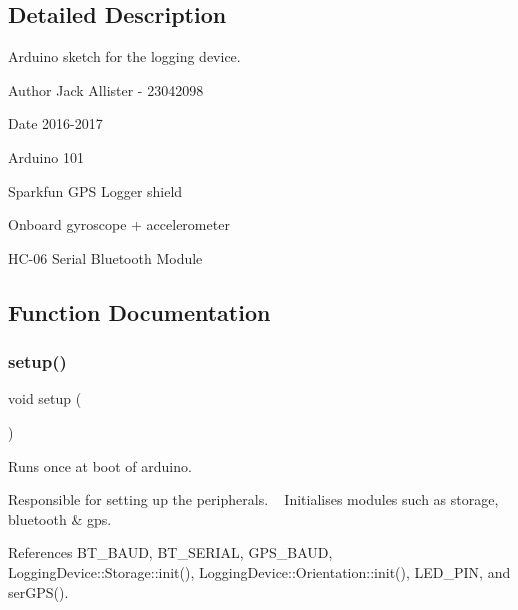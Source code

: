 \subsection{Detailed Description}
Arduino sketch for the logging device. 

\begin{DoxyAuthor}{Author}
Jack Allister -\/ 23042098 
\end{DoxyAuthor}
\begin{DoxyDate}{Date}
2016-\/2017
\begin{DoxyItemize}
\item Arduino 101
\item Sparkfun G\+PS Logger shield
\item Onboard gyroscope + accelerometer
\item H\+C-\/06 Serial Bluetooth Module 
\end{DoxyItemize}
\end{DoxyDate}


\subsection{Function Documentation}
\mbox{\label{logging-device_8ino_a4fc01d736fe50cf5b977f755b675f11d}} 
\subsubsection{\texorpdfstring{setup()}{setup()}}
{\footnotesize\ttfamily void setup (\begin{DoxyParamCaption}{ }\end{DoxyParamCaption})}



Runs once at boot of arduino. 

Responsible for setting up the peripherals. ~\newline
Initialises modules such as storage, bluetooth \& gps. 

References B\+T\+\_\+\+B\+A\+UD, B\+T\+\_\+\+S\+E\+R\+I\+AL, G\+P\+S\+\_\+\+B\+A\+UD, Logging\+Device\+::\+Storage\+::init(), Logging\+Device\+::\+Orientation\+::init(), L\+E\+D\+\_\+\+P\+IN, and ser\+G\+P\+S().



